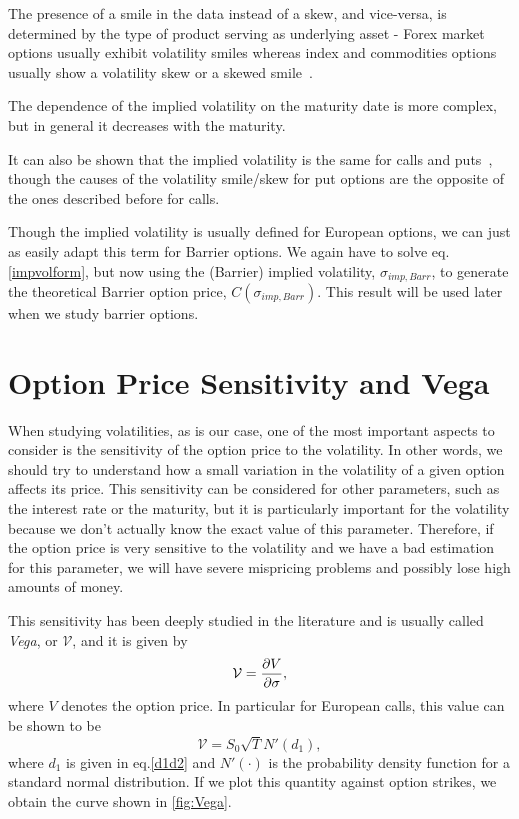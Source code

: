 The presence of a smile in the data instead of a skew, and vice-versa, is determined by the type of product serving as underlying asset - Forex market options usually exhibit volatility smiles whereas index and commodities options usually show a volatility skew or a skewed smile~\citep{Wilmott3}.

The dependence of the implied volatility on the maturity date is more complex, but in general it decreases with the maturity.

It can also be shown that the implied volatility is the same for calls and puts~\citep{Hull}, though the causes of the volatility smile/skew for put options are the opposite of the ones described before for calls.

Though the implied volatility is usually defined for European options, we can just as easily adapt this term for Barrier options. We again have to solve eq.\eqref{impvolform}, but now using the (Barrier) implied volatility, $\sigma_{imp,Barr}$, to generate the theoretical Barrier option price, $C(\sigma_{imp,Barr})$. This result will be used later when we study barrier options.


\section{Option Price Sensitivity and Vega}
\label{section:vega}
When studying volatilities, as is our case, one of the most important aspects to consider is the sensitivity of the option price to the volatility. In other words, we should try to understand how a small variation in the volatility of a given option affects its price. This sensitivity can be considered for other parameters, such as the interest rate or the maturity, but it is particularly important for the volatility because we don't actually know the exact value of this parameter. Therefore, if the option price is very sensitive to the volatility and we have a bad estimation for this parameter, we will have severe mispricing problems and possibly lose high amounts of money.

This sensitivity has been deeply studied in the literature and is usually called \emph{Vega}, or $\mathcal{V}$, and it is given by
\begin{equation}
\mathcal{V}=\pdv{V}{\sigma},
\end{equation}
\noindent where $V$ denotes the option price.
In particular for European calls, this value can be shown to be~\citep{Hull}
\begin{equation}
\mathcal{V}=S_0\sqrt{T}N'(d_1),
\end{equation}
\noindent where $d_1$ is given in eq.\eqref{d1d2} and $N'(\cdot)$ is the probability density function for a standard normal distribution.
If we plot this quantity against option strikes, we obtain the curve shown in \autoref{fig:Vega}.

